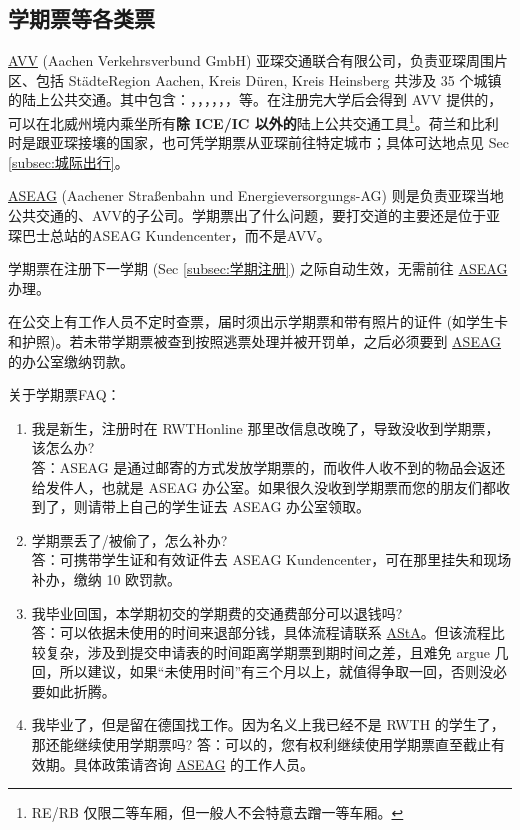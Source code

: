   \subsection{学期票等各类票}\label{subsec:学期票等各类票}

    \href{https://avv.de/de/}{AVV} (Aachen Verkehrsverbund GmbH) 亚琛交通联合有限公司，负责亚琛周围片区、包括 StädteRegion Aachen, Kreis Düren, Kreis Heinsberg 共涉及 35 个城镇的陆上公共交通。其中包含：，，，，，，等。在注册完大学后会得到 AVV 提供的，可以在北威州境内乘坐所有\textbf{除 ICE/IC 以外的}陆上公共交通工具\footnote{RE/RB 仅限二等车厢，但一般人不会特意去蹭一等车厢。}。荷兰和比利时是跟亚琛接壤的国家，也可凭学期票从亚琛前往特定城市；具体可达地点见 Sec \ref{subsec:城际出行}。

    \href{http://www.aseag.de/}{ASEAG} (Aachener Straßenbahn und Energieversorgungs-AG) 则是负责亚琛当地公共交通的、AVV的子公司。学期票出了什么问题，要打交道的主要还是位于亚琛巴士总站的ASEAG Kundencenter，而不是AVV。

    学期票在注册下一学期 (Sec \ref{subsec:学期注册}) 之际自动生效，无需前往 \href{http://www.aseag.de/}{ASEAG} 办理。

    在公交上有工作人员不定时查票，届时须出示学期票和带有照片的证件 (如学生卡和护照)。若未带学期票被查到按照逃票处理并被开罚单，之后必须要到 \href{http://www.aseag.de/}{ASEAG} 的办公室缴纳罚款。

    关于学期票FAQ：

    \begin{enumerate}
      \item 我是新生，注册时在 RWTHonline 那里改信息改晚了，导致没收到学期票，该怎么办?\\
      答：ASEAG 是通过邮寄的方式发放学期票的，而收件人收不到的物品会返还给发件人，也就是 ASEAG 办公室。如果很久没收到学期票而您的朋友们都收到了，则请带上自己的学生证去 ASEAG 办公室领取。
      \item 学期票丢了/被偷了，怎么补办?\\
      答：可携带学生证和有效证件去 ASEAG Kundencenter，可在那里挂失和现场补办，缴纳 10 欧罚款。
      \item 我毕业回国，本学期初交的学期费的交通费部分可以退钱吗?\\
      答：可以依据未使用的时间来退部分钱，具体流程请联系 \href{https://www.asta.rwth-aachen.de/en/}{AStA}。但该流程比较复杂，涉及到提交申请表的时间距离学期票到期时间之差，且难免 argue 几回，所以建议，如果``未使用时间''有三个月以上，就值得争取一回，否则没必要如此折腾。
      \item 我毕业了，但是留在德国找工作。因为名义上我已经不是 RWTH 的学生了，那还能继续使用学期票吗?
      答：可以的，您有权利继续使用学期票直至截止有效期。具体政策请咨询 \href{http://www.aseag.de/}{ASEAG} 的工作人员。
    \end{enumerate}

